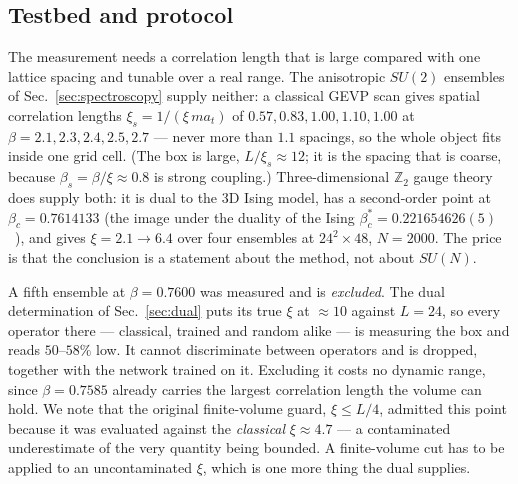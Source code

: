 \documentclass[aps,prl,reprint,superscriptaddress,nofootinbib]{revtex4-2}
\newcommand{\at}{a_t}
\newcommand{\Zt}{\mathbb{Z}_2}
\begin{document}
\subsection{Testbed and protocol}

The measurement needs a correlation length that is large compared with one
lattice spacing and tunable over a real range. The anisotropic $SU(2)$ ensembles
of Sec.~\ref{sec:spectroscopy} supply neither: a classical GEVP scan gives
spatial correlation lengths $\xi_s=1/(\xi\,m\at)$ of
$0.57,0.83,1.00,1.10,1.00$ at $\beta=2.1,2.3,2.4,2.5,2.7$ --- never more than
$1.1$ spacings, so the whole object fits inside one grid cell. (The box is
large, $L/\xi_s\approx12$; it is the spacing that is coarse, because
$\beta_s=\beta/\xi\approx0.8$ is strong coupling.) Three-dimensional $\Zt$ gauge
theory~\cite{Wegner1971} does supply both: it is dual to the 3D Ising model, has
a second-order point at $\beta_c=0.7614133$ (the image under the duality of the
Ising $\beta^\ast_c=0.221654626(5)$~\cite{FerrenbergXuLandau2018}), and gives
$\xi=2.1\to6.4$ over four ensembles at $24^2\times48$, $N=2000$. The price is
that the conclusion is a statement about the method, not about $SU(N)$.

A fifth ensemble at $\beta=0.7600$ was measured and is \emph{excluded}. The dual
determination of Sec.~\ref{sec:dual} puts its true $\xi$ at $\approx10$ against
$L=24$, so every operator there --- classical, trained and random alike --- is
measuring the box and reads $50$--$58\%$ low. It cannot discriminate between
operators and is dropped, together with the network trained on it. Excluding it
costs no dynamic range, since $\beta=0.7585$ already carries the largest
correlation length the volume can hold. We note that the original
finite-volume guard, $\xi\le L/4$, admitted this point because it was evaluated
against the \emph{classical} $\xi\approx4.7$ --- a contaminated underestimate of
the very quantity being bounded. A finite-volume cut has to be applied to an
uncontaminated $\xi$, which is one more thing the dual supplies.
\end{document}
